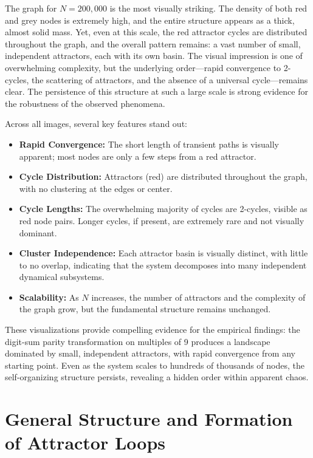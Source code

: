 \documentclass[12pt]{article}
\begin{document}
The graph for $N = 200,000$ is the most visually striking. The density of both red and grey nodes is extremely high, and the entire structure appears as a thick, almost solid mass. Yet, even at this scale, the red attractor cycles are distributed throughout the graph, and the overall pattern remains: a vast number of small, independent attractors, each with its own basin. The visual impression is one of overwhelming complexity, but the underlying order—rapid convergence to 2-cycles, the scattering of attractors, and the absence of a universal cycle—remains clear. The persistence of this structure at such a large scale is strong evidence for the robustness of the observed phenomena.

Across all images, several key features stand out:
\begin{itemize}
    \item \textbf{Rapid Convergence:} The short length of transient paths is visually apparent; most nodes are only a few steps from a red attractor.
    \item \textbf{Cycle Distribution:} Attractors (red) are distributed throughout the graph, with no clustering at the edges or center.
    \item \textbf{Cycle Lengths:} The overwhelming majority of cycles are 2-cycles, visible as red node pairs. Longer cycles, if present, are extremely rare and not visually dominant.
    \item \textbf{Cluster Independence:} Each attractor basin is visually distinct, with little to no overlap, indicating that the system decomposes into many independent dynamical subsystems.
    \item \textbf{Scalability:} As $N$ increases, the number of attractors and the complexity of the graph grow, but the fundamental structure remains unchanged.
\end{itemize}

These visualizations provide compelling evidence for the empirical findings: the digit-sum parity transformation on multiples of 9 produces a landscape dominated by small, independent attractors, with rapid convergence from any starting point. Even as the system scales to hundreds of thousands of nodes, the self-organizing structure persists, revealing a hidden order within apparent chaos.

\section{General Structure and Formation of Attractor Loops}
\end{document}

